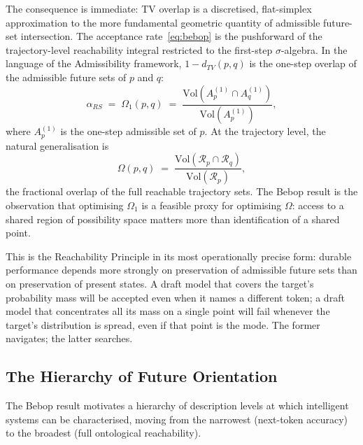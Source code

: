 \documentclass[12pt, letterpaper]{article}
\theoremstyle{remark}
\begin{document}
The consequence is immediate: TV overlap is a discretised, flat-simplex
approximation to the more fundamental geometric quantity of admissible
future-set intersection.  The acceptance rate~\eqref{eq:bebop} is the
pushforward of the trajectory-level reachability integral restricted to
the first-step $\sigma$-algebra.  In the language of the Admissibility
framework, $1 - d_{TV}(p, q)$ is the one-step overlap of the admissible
future sets of $p$ and $q$:
\begin{equation}
  \alpha_{RS}
  \;=\;
  \Omega_1(p, q)
  \;=\;
  \frac{\mathrm{Vol}(A_p^{(1)} \cap A_q^{(1)})}{\mathrm{Vol}(A_p^{(1)})},
\end{equation}
where $A_p^{(1)}$ is the one-step admissible set of $p$.  At the trajectory
level, the natural generalisation is
\begin{equation}
  \Omega(p, q)
  \;=\;
  \frac{\mathrm{Vol}(\mathcal{R}_p \cap \mathcal{R}_q)}{\mathrm{Vol}(\mathcal{R}_p)},
\end{equation}
the fractional overlap of the full reachable trajectory sets.  The Bebop
result is the observation that optimising $\Omega_1$ is a feasible proxy
for optimising $\Omega$: access to a shared region of possibility space
matters more than identification of a shared point.

This is the Reachability Principle in its most operationally precise form:
durable performance depends more strongly on preservation of admissible
future sets than on preservation of present states.  A draft model that
covers the target's probability mass will be accepted even when it names
a different token; a draft model that concentrates all its mass on a single
point will fail whenever the target's distribution is spread, even if that
point is the mode.  The former navigates; the latter searches.

\subsection{The Hierarchy of Future Orientation}

The Bebop result motivates a hierarchy of description levels at which
intelligent systems can be characterised, moving from the narrowest
(next-token accuracy) to the broadest (full ontological reachability).
\end{document}
